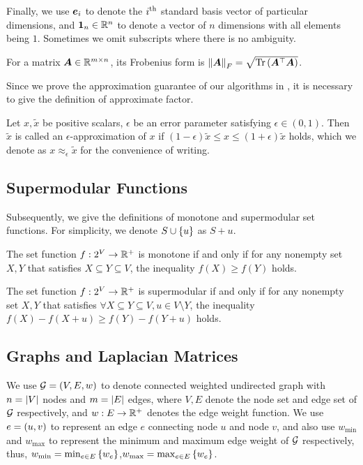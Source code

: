 \documentclass[sigconf]{acmart}
\begin{document}
Finally, we use \(\boldsymbol{e}_i\) to denote the \({i}^{\rm{th}}\) standard basis vector of particular dimensions, and \(\boldsymbol{1}_n\in \mathbb{R}^n\) to denote a vector of \(n\) dimensions with all elements being \(1\).
Sometimes we omit subscripts where there is no ambiguity.

For a matrix \(\boldsymbol{A}\in\mathbb{R}^{m\times n}\), its Frobenius form is \(\left\Vert\boldsymbol{A}\right\Vert_F=\sqrt{\mathrm{Tr}\left(\boldsymbol{A}^\top\boldsymbol{A}\right)}\).

Since we prove the approximation guarantee of our algorithms in , it is necessary to give the definition of approximate factor.

\begin{definition}
  Let \(x,\tilde{x}\) be positive scalars, \(\epsilon\) be an error parameter satisfying \(\epsilon\in(0,1)\).
  Then \(\tilde{x}\) is called an \(\epsilon\)-approximation of \(x\) if \((1-\epsilon)\tilde{x}\le x\le(1+\epsilon)\tilde{x}\) holds, which we denote as \(x\approx_{\epsilon}\tilde{x}\) for the convenience of writing.
\end{definition}

\subsection{Supermodular Functions}

Subsequently, we give the definitions of monotone and supermodular set functions. For simplicity, we denote \(S\cup\left\{u \right\}\) as \(S+u\).

\begin{definition}[Monotonicity]
  The set function \(f:2^{V}\to\mathbb{R}^+\) is monotone if and only if for any nonempty set \(X,Y\) that satisfies \(X\subseteq Y\subseteq V\), the inequality \(f(X)\ge f(Y)\) holds.
\end{definition}

\begin{definition}[Supermodularity]
  The set function \(f:2^{V}\to\mathbb{R}^+\) is supermodular if and only if for any nonempty set \(X,Y\) that satisfies \(\forall X\subseteq Y\subseteq V, u\in V\setminus Y\), the inequality \(f(X)-f(X+u)\ge f(Y)-f(Y+u)\) holds.
\end{definition}

\subsection{Graphs and Laplacian Matrices}\label{sub:lap}

We use \(\mathcal{G}=(V,E,w)\) to denote connected weighted undirected graph with \(n=\left|V \right|\) nodes and \(m=\left|E \right|\) edges, where \(V,E\) denote the node set and edge set of \(\mathcal{G}\) respectively, and \(w:E\to\mathbb{R}^+\) denotes the edge weight function.
We use \(e=\left( u,v \right)\) to represent an edge \(e\) connecting node \(u\) and node \(v\), and also use \(w_{\min}\) and \(w_{\max}\) to represent the minimum and maximum edge weight of \(\mathcal{G}\) respectively, thus, \(w_{\min}=\min_{e\in E}\left\{w_e \right\}\),\(w_{\max}=\max_{e\in E}\left\{w_e \right\}\).
\end{document}
